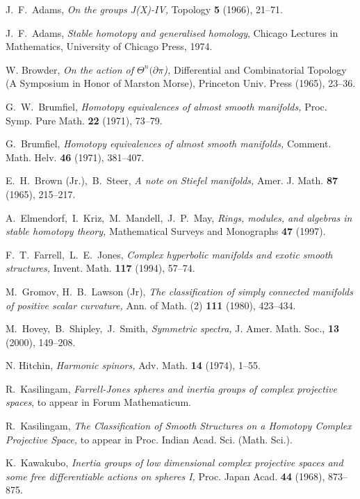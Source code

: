 \documentclass[a4paper,leqno,12pt]{amsart}
\theoremstyle{plain}
\theoremstyle{definition}
\numberwithin{equation}{section}
\begin{document}
\begin{thebibliography}{10}
 J.~F.~Adams, {\em On the groups J(X)-IV,} Topology {\bf 5} (1966), 21--71.

 J.~F.~Adams, {\em Stable homotopy and generalised homology}, Chicago Lectures in Mathematics, University of Chicago Press, 1974.

 W. Browder, \emph{On the action of $\Theta^{n}(\partial \pi$), } Differential and Combinatorial Topology (A Symposium in Honor of Marston Morse), Princeton Univ. Press (1965), 23--36.

G.~W.~Brumfiel, {\em Homotopy equivalences of almost smooth manifolds,} Proc. Symp. Pure Math. \textbf{22} (1971), 73--79.

G.~Brumfiel, {\em Homotopy equivalences of almost smooth manifolds,} Comment. Math. Helv. \textbf{46} (1971), 381--407.

E.~H.~Brown (Jr.),~B.~Steer, {\em A note on Stiefel manifolds,} Amer. J. Math. \textbf{87} (1965), 215--217.

 A.~Elmendorf,~I.~Kriz,~M.~Mandell,~J.~P.~May, {\em Rings, modules, and algebras in stable homotopy theory,} Mathematical Surveys and Monographs {\bf 47} (1997).

 F.~T.~Farrell,~L.~E.~Jones, {\em Complex hyperbolic manifolds and exotic smooth structures,} Invent. Math. {\bf 117} (1994), 57--74. 

M.~Gromov, H.~B.~Lawson (Jr), {\em The classification of simply connected manifolds of positive scalar curvature,} Ann. of Math. (2) \textbf{111} (1980), 423--434.

 M.~Hovey,~B.~Shipley,~J.~Smith, {\em Symmetric spectra,} J. Amer. Math. Soc., {\bf 13} (2000), 149--208.

N. Hitchin, {\em Harmonic spinors,} Adv. Math. \textbf{14} (1974), 1--55.

R.~Kasilingam, {\em Farrell-Jones spheres and inertia groups of complex projective spaces}, to appear in Forum Mathematicum.

R.~Kasilingam, {\em The Classification of Smooth Structures on a Homotopy Complex Projective Space,} to appear in Proc. Indian Acad. Sci. (Math. Sci.).

K.~Kawakubo, {\em Inertia groups of low dimensional complex projective spaces and some free differentiable actions on spheres I,} Proc. Japan Acad. \textbf{44} (1968), 873--875.


\end{thebibliography}
\end{document}
